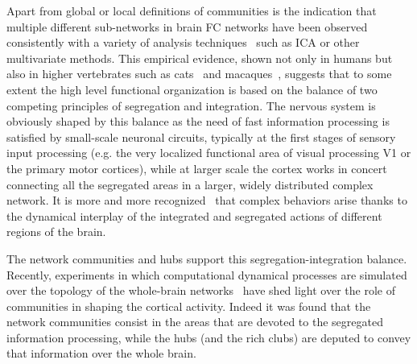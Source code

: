 Apart from global or local definitions of communities is the indication that multiple different sub-networks in brain FC networks have been observed consistently with a variety of analysis techniques~\cite{fox2005,deluca2006,schwarz2007} such as ICA or other multivariate methods.
This empirical evidence, shown not only in humans but also in higher vertebrates such as cats~\cite{scannell1995} and macaques~\cite{felleman1991}, suggests that to some extent the high level functional organization is based on the balance of two competing principles of segregation and integration.
The nervous system is obviously shaped by this balance as the need of fast information processing is satisfied by small-scale neuronal circuits, typically at the first stages of sensory input processing (e.g. the very localized functional area of visual processing V1 or the primary motor cortices), while at larger scale the cortex works in concert connecting all the segregated areas in a larger, widely distributed complex network.
It is more and more recognized~\cite{tononi1994,tononi1998,deco2015} that complex behaviors arise thanks to the dynamical interplay of the integrated and segregated actions of different regions of the brain.

The network communities and hubs support this segregation-integration balance. Recently, experiments in which computational dynamical processes are simulated over the topology of the whole-brain networks~\cite{deco2015} have shed light over the role of communities in shaping the cortical activity. Indeed it was found that the network communities consist in the areas that are devoted to the segregated information processing, while the hubs (and the rich clubs) are deputed to convey that information over the whole brain.

